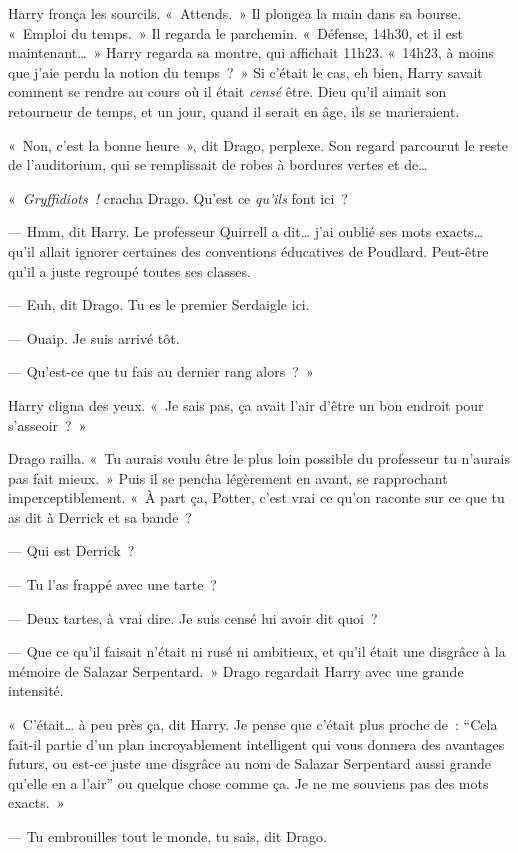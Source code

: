 Harry fronça les sourcils. «~Attends.~» Il plongea la main dans sa bourse.
«~Emploi du temps.~» Il regarda le parchemin.
«~Défense, 14h30, et il est maintenant…~» Harry regarda sa montre, qui affichait 11h23.
«~14h23, à moins que j'aie perdu la notion du temps~?~»
Si c'était le cas, eh bien, Harry savait comment se rendre au cours où il était \emph{censé} être.
Dieu qu'il aimait son retourneur de temps, et un jour, quand il serait en âge, ils se marieraient.

«~Non, c'est la bonne heure~», dit Drago, perplexe.
Son regard parcourut le reste de l'auditorium, qui se remplissait de robes à bordures vertes et de…

«~\emph{Gryffidiots~!} cracha Drago. Qu'est ce \emph{qu'ils} font ici~?

--- Hmm, dit Harry. Le professeur Quirrell a dit… j'ai oublié ses mots exacts… qu'il allait ignorer certaines des conventions éducatives de Poudlard.
Peut-être qu'il a juste regroupé toutes ses classes.

--- Euh, dit Drago. Tu es le premier Serdaigle ici.

--- Ouaip. Je suis arrivé tôt.

--- Qu'est-ce que tu fais au dernier rang alors~?~»

Harry cligna des yeux. «~Je sais pas, ça avait l'air d'être un bon endroit pour s'asseoir~?~»

Drago railla. «~Tu aurais voulu être le plus loin possible du professeur tu n'aurais pas fait mieux.~»
Puis il se pencha légèrement en avant, se rapprochant imperceptiblement.
«~À part ça, Potter, c'est vrai ce qu'on raconte sur ce que tu as dit à Derrick et sa bande~?

--- Qui est Derrick~?

--- Tu l'as frappé avec une tarte~?

--- Deux tartes, à vrai dire. Je suis censé lui avoir dit quoi~?

--- Que ce qu'il faisait n'était ni rusé ni ambitieux, et qu'il était une disgrâce à la mémoire de Salazar Serpentard.~»
Drago regardait Harry avec une grande intensité.

«~C'était… à peu près ça, dit Harry. Je pense que c'était plus proche de~: “Cela fait-il partie d'un plan incroyablement intelligent qui vous donnera des avantages futurs, ou est-ce juste une disgrâce au nom de Salazar Serpentard aussi grande qu'elle en a l'air”
ou quelque chose comme ça. Je ne me souviens pas des mots exacts.~»

--- Tu embrouilles tout le monde, tu sais, dit Drago.

